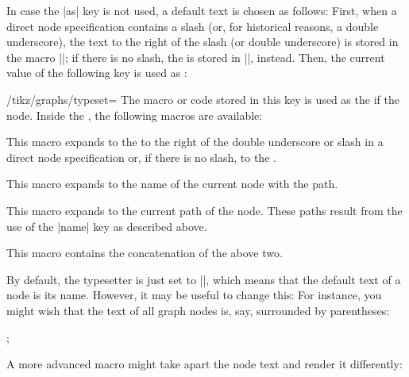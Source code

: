\begin{itemize}
  In case the |as| key is not used, a default text
  is chosen as follows: First, when a direct node specification
  contains a slash (or, for historical reasons, a double underscore),
  the text to the right of the slash (or double underscore) is stored
  in the macro |\tikzgraphnodetext|; if 
  there is no slash, the  is stored in
  |\tikzgraphnodetext|, instead. Then, the current value of the
  following key is used as :
  \begin{key}{/tikz/graphs/typeset=}
    The macro or code stored in this key is used as the
     if the node. Inside the , the following
    macros are available:
    \begin{command}{\tikzgraphnodetext}
      This macro expands to the  to the right of the double
      underscore or slash in a direct node specification or, if there
      is no slash, to the .
    \end{command}
    \begin{command}{\tikzgraphnodename}
      This macro expands to the name of the current node with the
      path. 
    \end{command}
    \begin{command}{\tikzgraphnodepath}
      This macro expands to the current path of the node. These
      paths result from the use of the |name| key as described above.
    \end{command}
    \begin{command}{\tikzgraphnodefullname}
      This macro contains the concatenation of the above two.
    \end{command}
  \end{key}
  By default, the typesetter is just set to |\tikzgraphnodetext|,
  which means that the default text of a node is its name. However,
  it may be useful to change this: For instance, you might wish that
  the text of all graph nodes is, say, surrounded by parentheses:
  \begin{codeexample}[]
\tikz {};
  \end{codeexample}
  A more advanced macro might take apart the node text and render it
  differently: 

\end{itemize}

